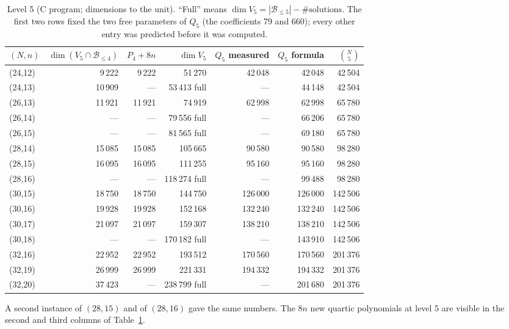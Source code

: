 \documentclass[11pt,a4paper]{article}
\theoremstyle{remark}\newtheorem{remark}{Remark}
\newcommand{\B}{\mathcal{B}}
\begin{document}
\begin{table}[ht]\centering\small
\caption{Level 5 (C program; dimensions to the unit). ``Full'' means $\dim V_5=|\B_{\le5}|-\#\text{solutions}$. The first two rows fixed the two free parameters of $Q_5$ (the coefficients 79 and 660); every other entry was predicted before it was computed.}\label{tab:level5}
\begin{tabular}{lrrrrrr}
\toprule
$(N,n)$ & $\dim(V_5\cap\B_{\le4})$ & $P_4+8n$ & $\dim V_5$ & $Q_5$ measured & $Q_5$ formula & $\binom N5$\\
\midrule
(24,12) & 9\,222 & 9\,222 & 51\,270 & 42\,048 & 42\,048 & 42\,504\\
(24,13) & 10\,909 & --- & 53\,413 full & --- & 44\,148 & 42\,504\\
(26,13) & 11\,921 & 11\,921 & 74\,919 & 62\,998 & 62\,998 & 65\,780\\
(26,14) & --- & --- & 79\,556 full & --- & 66\,206 & 65\,780\\
(26,15) & --- & --- & 81\,565 full & --- & 69\,180 & 65\,780\\
(28,14) & 15\,085 & 15\,085 & 105\,665 & 90\,580 & 90\,580 & 98\,280\\
(28,15) & 16\,095 & 16\,095 & 111\,255 & 95\,160 & 95\,160 & 98\,280\\
(28,16) & --- & --- & 118\,274 full & --- & 99\,488 & 98\,280\\
(30,15) & 18\,750 & 18\,750 & 144\,750 & 126\,000 & 126\,000 & 142\,506\\
(30,16) & 19\,928 & 19\,928 & 152\,168 & 132\,240 & 132\,240 & 142\,506\\
(30,17) & 21\,097 & 21\,097 & 159\,307 & 138\,210 & 138\,210 & 142\,506\\
(30,18) & --- & --- & 170\,182 full & --- & 143\,910 & 142\,506\\
(32,16) & 22\,952 & 22\,952 & 193\,512 & 170\,560 & 170\,560 & 201\,376\\
(32,19) & 26\,999 & 26\,999 & 221\,331 & 194\,332 & 194\,332 & 201\,376\\
(32,20) & 37\,423 & --- & 238\,799 full & --- & 201\,680 & 201\,376\\
\bottomrule
\end{tabular}
\end{table}

A second instance of $(28,15)$ and of $(28,16)$ gave the same numbers. The $8n$ new quartic polynomials at level 5 are visible in the second and third columns of Table~\ref{tab:level5}.
\end{document}
